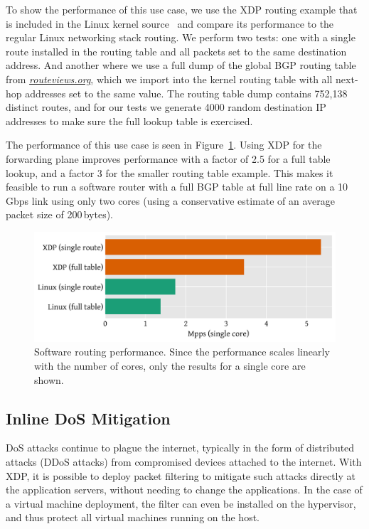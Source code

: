 \documentclass[10pt,sigconf]{acmart}
\begin{document}
To show the performance of this use case, we use the XDP routing example that is
included in the Linux kernel source~\cite{fwd-example} and compare its
performance to the regular Linux networking stack routing. We perform two tests:
one with a single route installed in the routing table and all packets set to
the same destination address. And another where we use a full dump of the global
BGP routing table from \emph{\url{routeviews.org}}, which we import into the
kernel routing table with all next-hop addresses set to the same value. The
routing table dump contains 752,138 distinct routes, and for our tests we
generate 4000 random destination IP addresses to make sure the full lookup table
is exercised.

The performance of this use case is seen in Figure~\ref{fig:router-fwd}. Using
XDP for the forwarding plane improves performance with a factor of 2.5 for a
full table lookup, and a factor 3 for the smaller routing table example. This
makes it feasible to run a software router with a full BGP table at full line
rate on a 10\,Gbps link using only two cores (using a conservative estimate of
an average packet size of 200\,bytes).

\begin{figure}[t]
\centering
\includegraphics[width=\linewidth]{figures/router-fwd.pdf}
\caption{\label{fig:router-fwd} Software routing performance. Since the
  performance scales linearly with the number of cores, only the results for a
  single core are shown.}
\end{figure}


\subsection{Inline DoS Mitigation}
\label{sec:dos-usecase}
DoS attacks continue to plague the internet, typically in the form of
distributed attacks (DDoS attacks) from compromised devices attached to the
internet. With XDP, it is possible to deploy packet filtering to mitigate such
attacks directly at the application servers, without needing to change the
applications. In the case of a virtual machine deployment, the filter can even
be installed on the hypervisor, and thus protect all virtual machines running on
the host.
\end{document}

